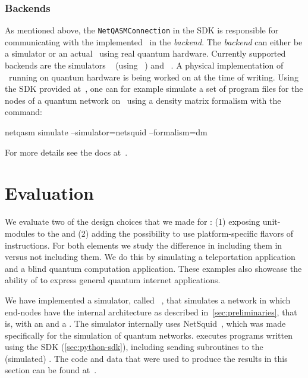 \subsubsection{Backends}
\label{sec:backends}
As mentioned above, the \texttt{NetQASMConnection} in the SDK is responsible for communicating with the implemented \QNPU\ in the \emph{backend}.
The \emph{backend} can either be a simulator or an actual \QNPU\ using real quantum hardware.
Currently supported backends are the simulators \squidasm~\cite{git_squidasm} (using \netsquid~\cite{netsquid, coopmans2021netsquid}) and \simulaqron~\cite{dahlberg2018simulaqron}.
A physical implementation of \QNPU\ running on quantum hardware is being worked on at the time of writing.
Using the SDK provided at~\cite{git_netqasm}, one can for example simulate a set of program files for the nodes of a quantum network on \netsquid\ using a density matrix formalism with the command:
\begin{nqcode}
  netqasm simulate --simulator=netsquid --formalism=dm
\end{nqcode}
For more details see the docs at~\cite{git_netqasm}.


\section{Evaluation}
\label{sec:evaluation}
We evaluate two of the design choices that we made for \netqasm:
    (1) exposing unit-modules to the \host and
    (2) adding the possibility to use platform-specific flavors of instructions.
For both elements we study the difference in including them in \netqasm versus not including them.
We do this by simulating a teleportation application and a blind quantum computation application.
These examples also showcase the ability of \netqasm to express general quantum internet applications.

We have implemented a simulator, called \squidasm~\cite{git_squidasm}, that simulates a network in which end-nodes have the internal architecture as described in~\cref{sec:preliminaries}, that is, with an \host and a \QNPU.
The simulator internally uses NetSquid~\cite{netsquid}, which was made specifically for the simulation of quantum networks.
\squidasm executes programs written using the SDK (\cref{sec:python-sdk}), including sending \netqasm subroutines to the (simulated) \QNPU.
The code and data that were used to produce the results in this section can be found at~\cite{git_netqasm_paper_data}.

